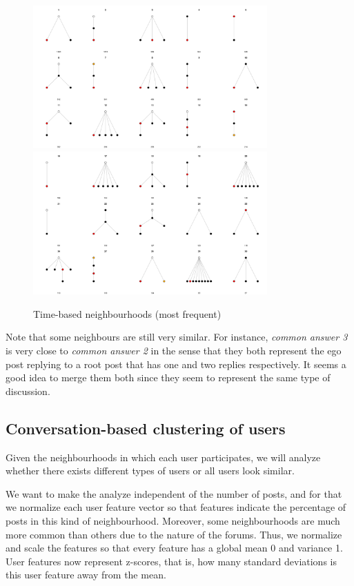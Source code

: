 \documentclass[conference]{IEEEtran}
\begin{document}
\begin{figure}
	\centering
	\includegraphics[width=0.8\textwidth]{neighbourhoods_time_1}
	\includegraphics[width=0.8\textwidth]{neighbourhoods_time_2}
	\caption{Time-based neighbourhoods (most frequent)}
	\label{fig:neighbourhoods_time}
\end{figure}


Note that some neighbours are still very similar. For instance, \textit{common answer 3} is very close to \textit{common answer 2} in the sense that they both represent the ego post replying to a root post that has one and two replies respectively. It seems a good idea to merge them both since they seem to represent the same type of discussion.

\subsection{Conversation-based clustering of users}

Given the neighbourhoods in which each user participates, we will analyze whether there exists different types of users or all users look similar.

We want to make the analyze independent of the number of posts, and for that we normalize each user feature vector so that features indicate the percentage of posts in this kind of neighbourhood. Moreover, some neighbourhoods are much more common than others due to the nature of the forums. Thus, we normalize and scale the features so that every feature has a global mean 0 and variance 1. User features now represent z-scores, that is, how many standard deviations is this user feature away from the mean.
\end{document}
